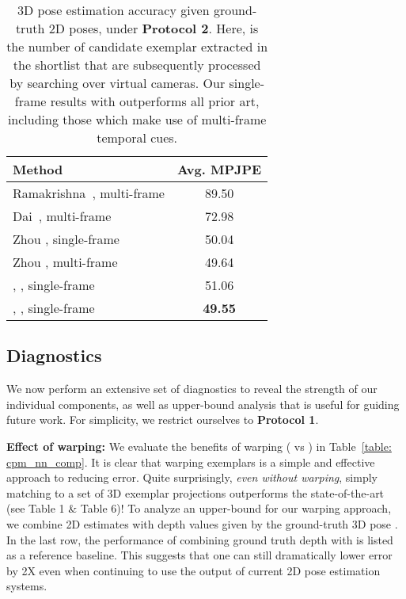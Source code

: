 \documentclass[10pt,twocolumn,letterpaper]{article}
\begin{document}
\begin{table}[t!]
\centering
\begin{tabular}{|l|c|}
\hline
Method  & Avg. MPJPE \\
\hline
\hline
Ramakrishna~\cite{ramakrishna2012reconstructing}, multi-frame & 89.50\\
Dai~\cite{dai2014simple}, multi-frame & 72.98\\
Zhou \cite{Zhou_2016_CVPR}, single-frame & 50.04 \\
Zhou \cite{Zhou_2016_CVPR}, multi-frame & 49.64 \\
\hline
, , single-frame & 51.06 \\
, , single-frame & {\bf 49.55} \\
\hline
\end{tabular}
\caption{3D pose estimation accuracy given ground-truth 2D poses, under {\bf Protocol 2}. Here,  is the number of candidate exemplar extracted in the shortlist that are subsequently processed by searching over virtual cameras. Our single-frame results with  outperforms all prior art, including those which make use of multi-frame temporal cues.}\label{table: procrus_compare}
\end{table}


\subsection{Diagnostics}
\label{exp1}

We now perform an extensive set of diagnostics to reveal the strength of our individual components, as well as upper-bound analysis that is useful for guiding future work. For simplicity, we restrict ourselves to \textbf{Protocol 1}.

{\bf Effect of warping:} We evaluate the benefits of warping ( vs ) in Table~\ref{table: cpm_nn_comp}. It is clear that warping exemplars  is a simple and effective approach to reducing error. Quite surprisingly, {\em even without warping}, simply matching to a set of 3D exemplar projections outperforms the state-of-the-art (see Table 1 \& Table 6)! To analyze an upper-bound for our warping approach, we combine 2D estimates  with depth values  given by the ground-truth 3D pose .
In the last row, the performance of combining ground truth depth  with  is listed as a reference baseline. This suggests that one can still dramatically lower error by 2X even when continuing to use the output of current 2D pose estimation systems. 
\end{document}
